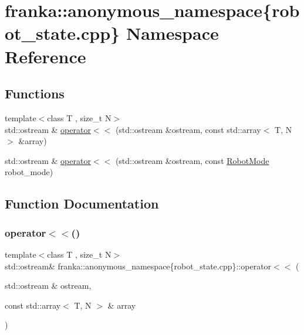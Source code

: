 \hypertarget{namespacefranka_1_1anonymous__namespace_02robot__state_8cpp_03}{}\section{franka\+:\+:anonymous\+\_\+namespace\{robot\+\_\+state.\+cpp\} Namespace Reference}
\label{namespacefranka_1_1anonymous__namespace_02robot__state_8cpp_03}
\subsection*{Functions}
\begin{DoxyCompactItemize}
\item 
{\footnotesize template$<$class T , size\+\_\+t N$>$ }\\std\+::ostream \& \hyperlink{namespacefranka_1_1anonymous__namespace_02robot__state_8cpp_03_a17af721f376e4c8955c455c1db15bdf6}{operator$<$$<$} (std\+::ostream \&ostream, const std\+::array$<$ T, N $>$ \&array)
\item 
std\+::ostream \& \hyperlink{namespacefranka_1_1anonymous__namespace_02robot__state_8cpp_03_a2cbd43861678488f626f5e01c62b8cc2}{operator$<$$<$} (std\+::ostream \&ostream, const \hyperlink{namespacefranka_adfe059ae23ebbad59e421edaa879651a}{Robot\+Mode} robot\+\_\+mode)
\end{DoxyCompactItemize}


\subsection{Function Documentation}
\mbox{\label{namespacefranka_1_1anonymous__namespace_02robot__state_8cpp_03_a17af721f376e4c8955c455c1db15bdf6}} 
\subsubsection{\texorpdfstring{operator$<$$<$()}{operator<<()}\hspace{0.1cm}{\footnotesize\ttfamily [1/2]}}
{\footnotesize\ttfamily template$<$class T , size\+\_\+t N$>$ \\
std\+::ostream\& franka\+::anonymous\+\_\+namespace\{robot\+\_\+state.\+cpp\}\+::operator$<$$<$ (\begin{DoxyParamCaption}\item[{std\+::ostream \&}]{ostream,  }\item[{const std\+::array$<$ T, N $>$ \&}]{array }\end{DoxyParamCaption})}



